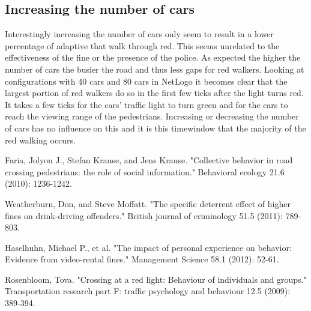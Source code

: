 \documentclass[a4paper]{article}
\begin{document}
\subsection{Increasing the number of cars}
Interestingly increasing the number of cars only seem to result in a lower percentage of adaptive that walk through red. This seems unrelated to the effectiveness of the fine or the presence of the police. As expected the higher the number of cars the busier the road and thus less gaps for red walkers. Looking at configurations with 40 cars and 80 cars in NetLogo it becomes clear that the largest portion of red walkers do so in the first few ticks after the light turns red. It takes a few ticks for the cars' traffic light to turn green and for the cars to reach the viewing range of the pedestrians. Increasing or decreasing the number of cars has no influence on this and it is this timewindow that the majority of the red walking occurs.


\clearpage

\begin{thebibliography}{3}

	 Faria, Jolyon J., Stefan Krause, and Jens Krause. "Collective behavior in road crossing pedestrians: the role of social information." Behavioral ecology 21.6 (2010): 1236-1242.

	 Weatherburn, Don, and Steve Moffatt. "The specific deterrent effect of higher fines on drink-driving offenders." British journal of criminology 51.5 (2011): 789-803.
    
	 Haselhuhn, Michael P., et al. "The impact of personal experience on behavior: Evidence from video-rental fines." Management Science 58.1 (2012): 52-61.
    
	 Rosenbloom, Tova. "Crossing at a red light: Behaviour of individuals and groups." Transportation research part F: traffic psychology and behaviour 12.5 (2009): 389-394.
	
\end{thebibliography}
\end{document}
